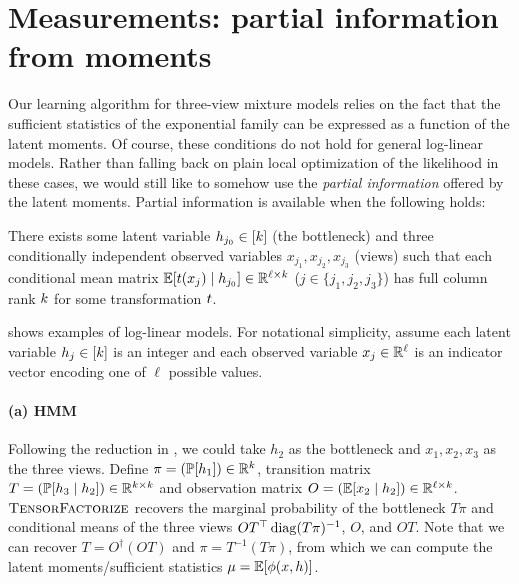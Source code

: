 \section{Measurements: partial information from moments} \label{sec:generalModels}

Our learning algorithm for three-view mixture models relies on the fact that
the sufficient statistics of the exponential family
can be expressed as a function of the latent moments.
Of course, these conditions do not hold for general log-linear models.
Rather than falling back on plain local optimization of the likelihood in these
cases, we would still like
to somehow use the \emph{partial information} offered by the latent moments.
Partial information is available when the following holds:
\begin{property}
  There exists some latent variable $h_{j_0} \in [k]$ (the bottleneck)
  and three conditionally independent observed variables $x_{j_1},x_{j_2},x_{j_3}$ (views) such that
  each conditional mean matrix $\mathbb{E}[t(x_{j}) \mid h_{j_0}] \in \mathbb{R}^{\ell \times k}$ ($j \in \{ j_1, j_2, j_3 \}$) has full column rank $k$
  for some transformation $t$.
\end{property}

 shows examples of log-linear models.
For notational simplicity, assume each latent variable $h_j \in [k]$ is an integer
and each observed variable $x_j \in \mathbb{R}^\ell$ is an indicator vector encoding
one of $\ell$
possible values.


\paragraph{(a) HMM}
Following the reduction in \citet{anandkumar12moments},
we could take $h_2$ as the bottleneck and $x_1, x_2, x_3$ as the three views.
Define $\pi = (\mathbb{P}[h_1]) \in \mathbb{R}^{k}$,
transition matrix $T = (\mathbb{P}[h_3 \mid h_2]) \in \mathbb{R}^{k \times k}$
and observation matrix $O = (\mathbb{E}[x_2 \mid h_2]) \in \mathbb{R}^{\ell \times k}$.
$\text{\sc TensorFactorize}$ recovers the marginal probability of the bottleneck
$T \pi$ and conditional means of the three views
$O T^\top \operatorname*{diag}(T \pi)^{-1}$,
$O$,
and $O T$.
Note that we can recover $T = O^\dagger(OT)$ and $\pi = T^{-1} (T\pi)$,
from which we can compute the latent moments/sufficient statistics $\mu = \mathbb{E}[\phi(x,h)]$.

